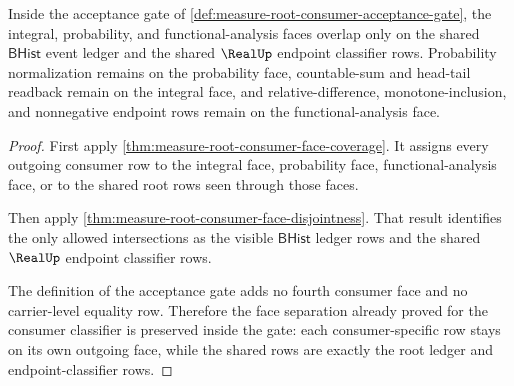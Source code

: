 \begin{theorem}
\label{thm:measure-root-consumer-acceptance-separation}
Inside the acceptance gate of
\autoref{def:measure-root-consumer-acceptance-gate}, the integral,
probability, and functional-analysis faces overlap only on the shared
$\mathsf{BHist}$ event ledger and the shared $\RealUp$ endpoint classifier
rows. Probability normalization remains on the probability face, countable-sum
and head-tail readback remain on the integral face, and relative-difference,
monotone-inclusion, and nonnegative endpoint rows remain on the
functional-analysis face.
\end{theorem}
\begin{proof}
First apply \autoref{thm:measure-root-consumer-face-coverage}. It assigns
every outgoing consumer row to the integral face, probability face,
functional-analysis face, or to the shared root rows seen through those faces.

Then apply \autoref{thm:measure-root-consumer-face-disjointness}. That result
identifies the only allowed intersections as the visible $\mathsf{BHist}$
ledger rows and the shared $\RealUp$ endpoint classifier rows.

The definition of the acceptance gate adds no fourth consumer face and no
carrier-level equality row. Therefore the face separation already proved for
the consumer classifier is preserved inside the gate: each consumer-specific
row stays on its own outgoing face, while the shared rows are exactly the
root ledger and endpoint-classifier rows.
\end{proof}

